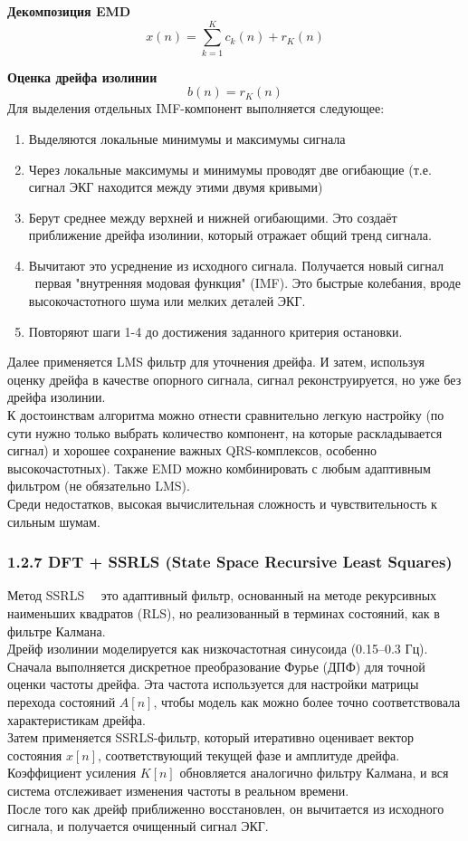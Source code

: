 \documentclass[10pt,a5paper]{article}
\numberwithin{figure}{section}
\numberwithin{table}{section}
\begin{document}
\textbf{Декомпозиция EMD}
\begin{equation*}
  x\left(n\right)=\sum_{k=1}^{K}{c_k\left(n\right)}+r_K\left(n\right)
\end{equation*}

\textbf{Оценка дрейфа изолинии}
\begin{equation*}
  b\left(n\right)=r_K\left(n\right)
\end{equation*}
Для выделения отдельных IMF-компонент выполняется следующее:
\begin{enumerate}
  \item Выделяются локальные минимумы и максимумы сигнала
  \item Через локальные максимумы и минимумы проводят две огибающие (т.е. сигнал ЭКГ находится между этими двумя кривыми)
  \item Берут среднее между верхней и нижней огибающими. Это создаёт приближение дрейфа изолинии, который отражает общий тренд сигнала.
  \item Вычитают это усреднение из исходного сигнала. Получается новый сигнал \textendash\ первая "внутренняя модовая функция" (IMF). Это быстрые колебания, вроде высокочастотного шума или мелких деталей ЭКГ.
  \item Повторяют шаги 1-4 до достижения заданного критерия остановки.
\end{enumerate}
Далее применяется LMS фильтр для уточнения дрейфа. И затем, используя оценку дрейфа в качестве опорного сигнала, сигнал реконструируется, но уже без дрейфа изолинии.\\
К достоинствам алгоритма можно отнести сравнительно легкую настройку (по сути нужно только выбрать количество компонент, на которые раскладывается сигнал) и хорошее сохранение важных QRS-комплексов, особенно высокочастотных). Также EMD можно комбинировать с любым адаптивным фильтром (не обязательно LMS).\\
Среди недостатков, высокая вычислительная сложность и чувствительность к сильным шумам.

\subsubsection{1.2.7 DFT + SSRLS (State Space Recursive Least Squares)}
Метод SSRLS~\cite{malik2004,sheikh2016} \textendash\ это адаптивный фильтр, основанный на методе рекурсивных наименьших квадратов (RLS), но реализованный в терминах состояний, как в фильтре Калмана.\\
Дрейф изолинии моделируется как низкочастотная синусоида (0.15–0.3 Гц). Сначала выполняется дискретное преобразование Фурье (ДПФ) для точной оценки частоты дрейфа. Эта частота используется для настройки матрицы перехода состояний $A[n]$, чтобы модель как можно более точно соответствовала характеристикам дрейфа.\\
Затем применяется SSRLS-фильтр, который итеративно оценивает вектор состояния $x[n]$, соответствующий текущей фазе и амплитуде дрейфа. Коэффициент усиления $K[n]$ обновляется аналогично фильтру Калмана, и вся система отслеживает изменения частоты в реальном времени.\\
После того как дрейф приближенно восстановлен, он вычитается из исходного сигнала, и получается очищенный сигнал ЭКГ.
\end{document}
